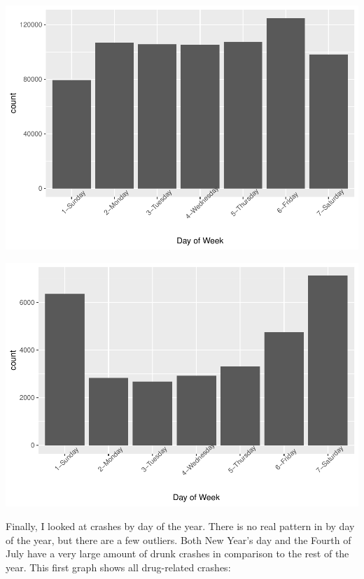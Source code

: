 \documentclass[conference,final,]{IEEEtran}
\begin{document}
\begin{center}\includegraphics[width=0.9\columnwidth]{CAUSE_files/figure-latex/unnamed-chunk-14-1} \end{center}

\begin{center}\includegraphics[width=0.9\columnwidth]{CAUSE_files/figure-latex/unnamed-chunk-14-2} \end{center}

Finally, I looked at crashes by day of the year. There is no real pattern in by day of the year, but there are a few outliers. Both New Year's day and the Fourth of July have a very large amount of drunk crashes in comparison to the rest of the year. This first graph shows all drug-related crashes:
\end{document}

